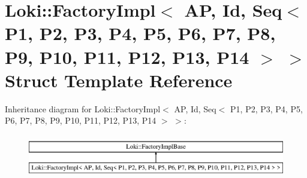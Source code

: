 \hypertarget{structLoki_1_1FactoryImpl_3_01AP_00_01Id_00_01Seq_3_01P1_00_01P2_00_01P3_00_01P4_00_01P5_00_01P6850e1763a62dd9e7d17183f42343611c}{}\section{Loki\+:\+:Factory\+Impl$<$ A\+P, Id, Seq$<$ P1, P2, P3, P4, P5, P6, P7, P8, P9, P10, P11, P12, P13, P14 $>$ $>$ Struct Template Reference}
\label{structLoki_1_1FactoryImpl_3_01AP_00_01Id_00_01Seq_3_01P1_00_01P2_00_01P3_00_01P4_00_01P5_00_01P6850e1763a62dd9e7d17183f42343611c}
Inheritance diagram for Loki\+:\+:Factory\+Impl$<$ A\+P, Id, Seq$<$ P1, P2, P3, P4, P5, P6, P7, P8, P9, P10, P11, P12, P13, P14 $>$ $>$\+:\begin{figure}[H]
\begin{center}
\leavevmode
\includegraphics[height=1.895093cm]{structLoki_1_1FactoryImpl_3_01AP_00_01Id_00_01Seq_3_01P1_00_01P2_00_01P3_00_01P4_00_01P5_00_01P6850e1763a62dd9e7d17183f42343611c}
\end{center}
\end{figure}
